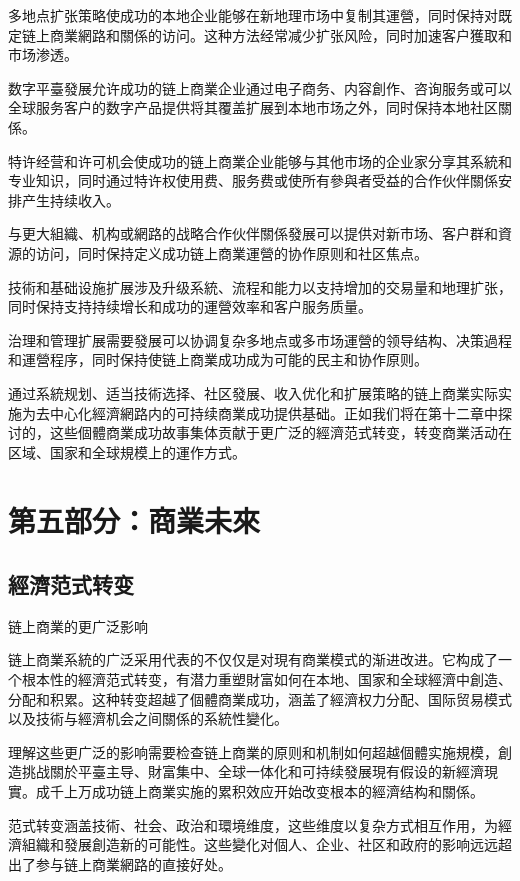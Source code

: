 \documentclass[
  Letterpaper,
]{scrbook}
\begin{document}
多地点扩张策略使成功的本地企业能够在新地理市场中复制其運營，同时保持对既定链上商業網路和關係的访问。这种方法经常减少扩张风险，同时加速客户獲取和市场渗透。

数字平臺發展允许成功的链上商業企业通过电子商务、内容創作、咨询服务或可以全球服务客户的数字产品提供将其覆盖扩展到本地市场之外，同时保持本地社区關係。

特许经营和许可机会使成功的链上商業企业能够与其他市场的企业家分享其系統和专业知识，同时通过特许权使用费、服务费或使所有參與者受益的合作伙伴關係安排产生持续收入。

与更大組織、机构或網路的战略合作伙伴關係發展可以提供对新市场、客户群和資源的访问，同时保持定义成功链上商業運營的协作原则和社区焦点。

技術和基础设施扩展涉及升级系統、流程和能力以支持增加的交易量和地理扩张，同时保持支持持续增长和成功的運營效率和客户服务质量。

治理和管理扩展需要發展可以协调复杂多地点或多市场運營的领导结构、决策過程和運營程序，同时保持使链上商業成功成为可能的民主和协作原则。

通过系統规划、适当技術选择、社区發展、收入优化和扩展策略的链上商業实际实施为去中心化經濟網路内的可持续商業成功提供基础。正如我们将在第十二章中探讨的，这些個體商業成功故事集体贡献于更广泛的經濟范式转变，转变商業活动在区域、国家和全球規模上的運作方式。

\part{第五部分：商業未來}

\chapter{經濟范式转变}\label{sec-paradigm-shift}

链上商業的更广泛影响

链上商業系統的广泛采用代表的不仅仅是对現有商業模式的渐进改进。它构成了一个根本性的經濟范式转变，有潜力重塑財富如何在本地、国家和全球經濟中創造、分配和积累。这种转变超越了個體商業成功，涵盖了經濟权力分配、国际贸易模式以及技術与經濟机会之间關係的系統性變化。

理解这些更广泛的影响需要检查链上商業的原则和机制如何超越個體实施規模，創造挑战關於平臺主导、財富集中、全球一体化和可持续發展現有假设的新經濟現實。成千上万成功链上商業实施的累积效应开始改变根本的經濟结构和關係。

范式转变涵盖技術、社会、政治和環境维度，这些维度以复杂方式相互作用，为經濟組織和發展創造新的可能性。这些變化对個人、企业、社区和政府的影响远远超出了参与链上商業網路的直接好处。
\end{document}
